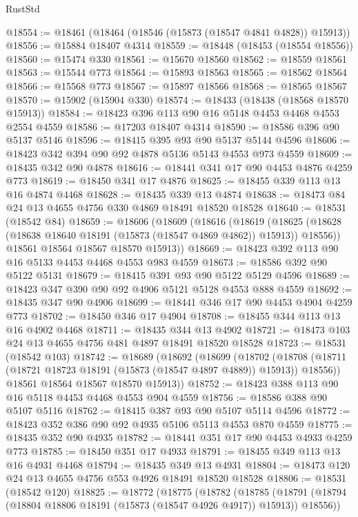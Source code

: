 \begin{lexlean}{RustStd}
\begin{coremodule}
@18554 := @18461 (@18464 (@18546 (@15873 (@18547 @4841 @4828)) @15913))
@18556 := @15884 @18407 @4314
@18559 := @18448 (@18453 (@18554 @18556))
@18560 := @15474 @330
@18561 := @15670 @18560
@18562 := @18559 @18561
@18563 := @15544 @773
@18564 := @15893 @18563
@18565 := @18562 @18564
@18566 := @15568 @773
@18567 := @15897 @18566
@18568 := @18565 @18567
@18570 := @15902 (@15904 @330)
@18574 := @18433 (@18438 (@18568 @18570 @15913))
@18584 := @18423 @396 @113 @90 @16 @5148 @4453 @4468 @4553 @2554 @4559
@18586 := @17203 @18407 @4314
@18590 := @18586 @396 @90 @5137 @5146
@18596 := @18415 @395 @93 @90 @5137 @5144 @4596
@18606 := @18423 @342 @394 @90 @92 @4878 @5136 @5143 @4553 @973 @4559
@18609 := @18435 @342 @90 @4878
@18616 := @18441 @341 @17 @90 @4453 @4876 @4259 @773
@18619 := @18450 @341 @17 @4876
@18625 := @18455 @339 @113 @13 @16 @4874 @4468
@18628 := @18435 @339 @13 @4874
@18638 := @18473 @84 @24 @13 @4655 @4756 @330 @4869 @18491 @18520 @18528
@18640 := @18531 (@18542 @84)
@18659 := @18606
    (@18609
      (@18616
        (@18619
          (@18625 (@18628 (@18638 @18640 @18191 (@15873 (@18547 @4869 @4862)) @15913)) @18556))
        @18561
        @18564
        @18567
        @18570
        @15913))
@18669 := @18423 @392 @113 @90 @16 @5133 @4453 @4468 @4553 @983 @4559
@18673 := @18586 @392 @90 @5122 @5131
@18679 := @18415 @391 @93 @90 @5122 @5129 @4596
@18689 := @18423 @347 @390 @90 @92 @4906 @5121 @5128 @4553 @888 @4559
@18692 := @18435 @347 @90 @4906
@18699 := @18441 @346 @17 @90 @4453 @4904 @4259 @773
@18702 := @18450 @346 @17 @4904
@18708 := @18455 @344 @113 @13 @16 @4902 @4468
@18711 := @18435 @344 @13 @4902
@18721 := @18473 @103 @24 @13 @4655 @4756 @481 @4897 @18491 @18520 @18528
@18723 := @18531 (@18542 @103)
@18742 := @18689
    (@18692
      (@18699
        (@18702
          (@18708 (@18711 (@18721 @18723 @18191 (@15873 (@18547 @4897 @4889)) @15913)) @18556))
        @18561
        @18564
        @18567
        @18570
        @15913))
@18752 := @18423 @388 @113 @90 @16 @5118 @4453 @4468 @4553 @904 @4559
@18756 := @18586 @388 @90 @5107 @5116
@18762 := @18415 @387 @93 @90 @5107 @5114 @4596
@18772 := @18423 @352 @386 @90 @92 @4935 @5106 @5113 @4553 @870 @4559
@18775 := @18435 @352 @90 @4935
@18782 := @18441 @351 @17 @90 @4453 @4933 @4259 @773
@18785 := @18450 @351 @17 @4933
@18791 := @18455 @349 @113 @13 @16 @4931 @4468
@18794 := @18435 @349 @13 @4931
@18804 := @18473 @120 @24 @13 @4655 @4756 @553 @4926 @18491 @18520 @18528
@18806 := @18531 (@18542 @120)
@18825 := @18772
    (@18775
      (@18782
        (@18785
          (@18791 (@18794 (@18804 @18806 @18191 (@15873 (@18547 @4926 @4917)) @15913)) @18556))

\end{coremodule}
\end{lexlean}
